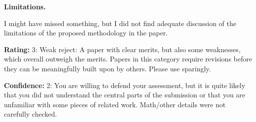 \textbf{Limitations.}

I might have missed something, but I did not find adequate discussion of the limitations of the proposed methodology in the paper.

\textbf{Rating:} 3: Weak reject: A paper with clear merits, but also some weaknesses, which overall outweigh the merits. Papers in this category require revisions before they can be meaningfully built upon by others. Please use sparingly.

\textbf{Confidence:} 2: You are willing to defend your assessment, but it is quite likely that you did not understand the central parts of the submission or that you are unfamiliar with some pieces of related work. Math/other details were not carefully checked.